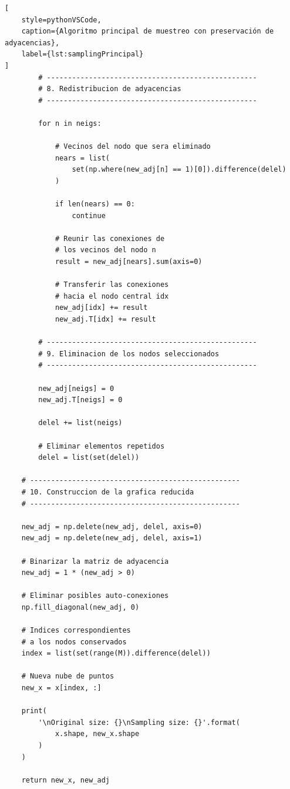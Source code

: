 \begin{lstlisting}[
    style=pythonVSCode,
    caption={Algoritmo principal de muestreo con preservación de adyacencias},
    label={lst:samplingPrincipal}
]
        # --------------------------------------------------
        # 8. Redistribucion de adyacencias
        # --------------------------------------------------

        for n in neigs:

            # Vecinos del nodo que sera eliminado
            nears = list(
                set(np.where(new_adj[n] == 1)[0]).difference(delel)
            )

            if len(nears) == 0:
                continue

            # Reunir las conexiones de
            # los vecinos del nodo n
            result = new_adj[nears].sum(axis=0)

            # Transferir las conexiones
            # hacia el nodo central idx
            new_adj[idx] += result
            new_adj.T[idx] += result

        # --------------------------------------------------
        # 9. Eliminacion de los nodos seleccionados
        # --------------------------------------------------

        new_adj[neigs] = 0
        new_adj.T[neigs] = 0

        delel += list(neigs)

        # Eliminar elementos repetidos
        delel = list(set(delel))

    # --------------------------------------------------
    # 10. Construccion de la grafica reducida
    # --------------------------------------------------

    new_adj = np.delete(new_adj, delel, axis=0)
    new_adj = np.delete(new_adj, delel, axis=1)

    # Binarizar la matriz de adyacencia
    new_adj = 1 * (new_adj > 0)

    # Eliminar posibles auto-conexiones
    np.fill_diagonal(new_adj, 0)

    # Indices correspondientes
    # a los nodos conservados
    index = list(set(range(M)).difference(delel))

    # Nueva nube de puntos
    new_x = x[index, :]

    print(
        '\nOriginal size: {}\nSampling size: {}'.format(
            x.shape, new_x.shape
        )
    )

    return new_x, new_adj
\end{lstlisting}